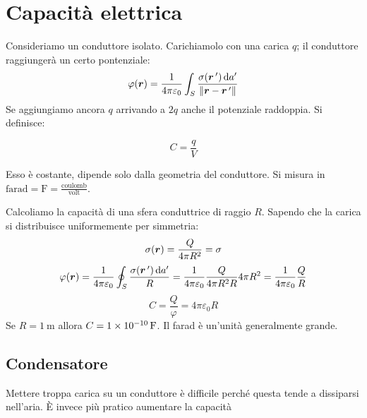 \section{Capacità elettrica}
Consideriamo un conduttore isolato. Carichiamolo con una carica $q$; il conduttore raggiungerà un certo pontenziale:
\[\varphi(\boldsymbol{r})=\frac{1}{4\pi\varepsilon_0}\int_S\frac{\sigma(\boldsymbol{r}\,')\,\mathrm{d} a'}{\left\lVert\boldsymbol{r}-\boldsymbol{r}\,'\right\rVert}\]
Se aggiungiamo ancora $q$ arrivando a $2q$ anche il potenziale raddoppia. Si definisce:
\begin{Def}
  \begin{equation}
    C=\frac{q}{V}
  \end{equation}
\end{Def}
Esso è costante, dipende solo dalla geometria del conduttore. Si misura in $\text{farad}=\si{\farad}=\frac{\text{coulomb}}{\text{volt}}$.
\begin{Es}[sfera]
  Calcoliamo la capacità di una sfera conduttrice di raggio $R$. Sapendo che la carica si distribuisce uniformemente per simmetria:
  \[\sigma(\boldsymbol{r})=\frac{Q}{4\pi R^2}=\sigma\]
  \[\varphi(\boldsymbol{r})=\frac{1}{4\pi\varepsilon_0}\oint_S\frac{\sigma(\boldsymbol{r}\,')\,\mathrm{d} a'}{R}=\frac{1}{4\pi\varepsilon_0}\frac{Q}{4\pi R^2 R}4\pi R^2=\frac{1}{4\pi\varepsilon_0}\frac{Q}{R}\]
  \[C=\frac{Q}{\varphi}=4\pi\varepsilon_0R\]
  Se $R=\SI{1}{\metre}$ allora $C=\SI{1E-10}{\farad}$. Il farad è un'unità generalmente grande.
\end{Es}
\subsection{Condensatore}
Mettere troppa carica su un conduttore è difficile perché questa tende a dissiparsi nell'aria. \`E invece più pratico aumentare la capacità

